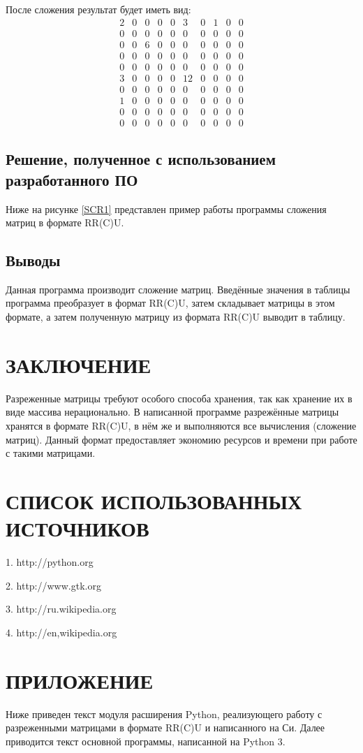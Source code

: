 После сложения результат будет иметь вид:
$$
\begin{array}{cccccccccc}
2	&0	&0	&0	&0	&3	&0	&1	&0	&0\\
0	&0	&0	&0	&0	&0	&0	&0	&0	&0\\
0	&0	&6	&0	&0	&0	&0	&0	&0	&0\\
0	&0	&0	&0	&0	&0	&0	&0	&0	&0\\
0	&0	&0	&0	&0	&0	&0	&0	&0	&0\\
3	&0	&0	&0	&0	&12	&0	&0	&0	&0\\
0	&0	&0	&0	&0	&0	&0	&0	&0	&0\\
1	&0	&0	&0	&0	&0	&0	&0	&0	&0\\
0	&0	&0	&0	&0	&0	&0	&0	&0	&0\\
0	&0	&0	&0	&0	&0	&0	&0	&0	&0
\end{array}
$$
\subsection{Решение, полученное с использованием разработанного ПО}
Ниже на рисунке \ref{SCR1} представлен пример работы программы сложения матриц в формате RR(C)U.
\subsection{Выводы}
Данная программа производит сложение матриц. Введённые значения в таблицы программа преобразует в формат RR(C)U, затем складывает матрицы в этом формате, а затем полученную матрицу из формата RR(C)U выводит в таблицу. 
\section*{ЗАКЛЮЧЕНИЕ}
Разреженные матрицы требуют особого способа хранения, так как хранение их в виде массива нерационально. В написанной программе разрежённые матрицы хранятся в формате RR(C)U, в нём же и выполняются все вычисления (сложение матриц). Данный формат предоставляет экономию ресурсов и времени при работе с такими матрицами.
\section*{СПИСОК ИСПОЛЬЗОВАННЫХ ИСТОЧНИКОВ}
1. http://python.org

2. http://www.gtk.org

3. http://ru.wikipedia.org

4. http://en,wikipedia.org
\section*{ПРИЛОЖЕНИЕ}
Ниже приведен текст модуля расширения Python, реализующего работу с разреженными матрицами в формате RR(C)U и написанного на Си.
Далее приводится текст основной программы, написанной на Python 3.

